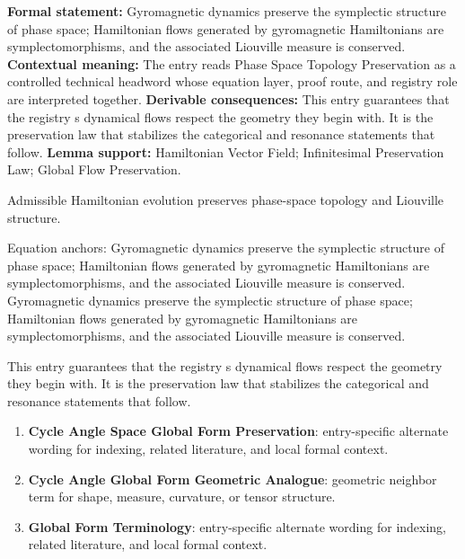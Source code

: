 \begingroup\footnotesize\setlength{\emergencystretch}{3em}\sloppy
\textbf{Formal statement:} Gyromagnetic dynamics preserve the symplectic structure of phase space; Hamiltonian flows generated by gyromagnetic Hamiltonians are symplectomorphisms, and the associated Liouville measure is conserved. \textbf{Contextual meaning:} The entry reads Phase Space Topology Preservation as a controlled technical headword whose equation layer, proof route, and registry role are interpreted together. \textbf{Derivable consequences:} This entry guarantees that the registry s dynamical flows respect the geometry they begin with. It is the preservation law that stabilizes the categorical and resonance statements that follow. \textbf{Lemma support:} Hamiltonian Vector Field; Infinitesimal Preservation Law; Global Flow Preservation.\par
\endgroup

Admissible Hamiltonian evolution preserves phase-space topology and Liouville structure.

Equation anchors: Gyromagnetic dynamics preserve the symplectic structure of phase space; Hamiltonian flows generated by gyromagnetic Hamiltonians are symplectomorphisms, and the associated Liouville measure is conserved. Gyromagnetic dynamics preserve the symplectic structure of phase space; Hamiltonian flows generated by gyromagnetic Hamiltonians are symplectomorphisms, and the associated Liouville measure is conserved.

This entry guarantees that the registry s dynamical flows respect the geometry they begin with. It is the preservation law that stabilizes the categorical and resonance statements that follow.
\endgroup

\begingroup\footnotesize\sloppy
\begin{enumerate}[leftmargin=1.35em,itemsep=1pt,topsep=1pt,parsep=0pt]
\item \textbf{Cycle Angle Space Global Form Preservation}: entry-specific alternate wording for indexing, related literature, and local formal context.
\item \textbf{Cycle Angle Global Form Geometric Analogue}: geometric neighbor term for shape, measure, curvature, or tensor structure.
\item \textbf{Global Form Terminology}: entry-specific alternate wording for indexing, related literature, and local formal context.
\end{enumerate}
\endgroup


